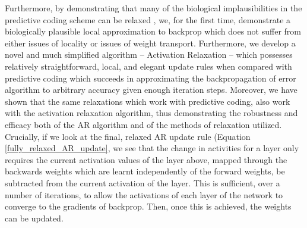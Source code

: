 Furthermore, by demonstrating that many of the biological implausibilities in the predictive coding scheme can be relaxed \citep{millidge2020relaxing}, we, for the first time, demonstrate a biologically plausible local approximation to backprop which does not suffer from either issues of locality or issues of weight transport. Furthermore, we develop a novel and much simplified algorithm -- Activation Relaxation -- which possesses relatively straightforward, local, and elegant update rules when compared with predictive coding which succeeds in approximating the backpropagation of error algorithm to arbitrary accuracy given enough iteration steps. Moreover, we have shown that the same relaxations which work with predictive coding, also work with the activation relaxation algorithm, thus demonstrating the robustness and efficacy both of the AR algorithm and of the methods of relaxation utilized. Crucially, if we look at the final, relaxed AR update rule (Equation \ref{fully_relaxed_AR_update}, we see that the change in activities for a layer only requires the current activation values of the layer above, mapped through the backwards weights which are learnt independently of the forward weights, be subtracted from the current activation of the layer. This is sufficient, over a number of iterations, to allow the activations of each layer of the network to converge to the gradients of backprop. Then, once this is achieved, the weights can be updated. 

